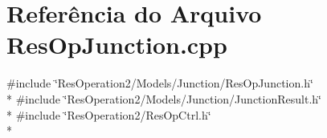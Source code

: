 \section{Referência do Arquivo Res\+Op\+Junction.\+cpp}
\label{_res_op_junction_8cpp}
{\ttfamily \#include \char`\"{}Res\+Operation2/\+Models/\+Junction/\+Res\+Op\+Junction.\+h\char`\"{}}\\*
{\ttfamily \#include \char`\"{}Res\+Operation2/\+Models/\+Junction/\+Junction\+Result.\+h\char`\"{}}\\*
{\ttfamily \#include \char`\"{}Res\+Operation2/\+Res\+Op\+Ctrl.\+h\char`\"{}}\\*
